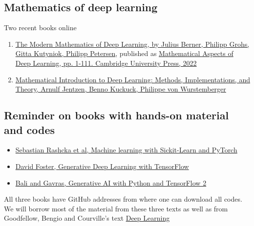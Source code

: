 \documentclass[%
oneside,                 %
final,                   %
10pt]{article}
\begin{document}
\subsection{Mathematics of deep learning}

\begin{block}{Two recent books online }
\begin{enumerate}
\item \href{{https://arxiv.org/abs/2105.04026}}{The Modern Mathematics of Deep Learning, by Julius Berner, Philipp Grohs, Gitta Kutyniok, Philipp Petersen}, published as \href{{https://doi.org/10.1017/9781009025096.002}}{Mathematical Aspects of Deep Learning, pp. 1-111. Cambridge University Press, 2022}

\item \href{{https://doi.org/10.48550/arXiv.2310.20360}}{Mathematical Introduction to Deep Learning: Methods, Implementations, and Theory, Arnulf Jentzen, Benno Kuckuck, Philippe von Wurstemberger}
\end{enumerate}

\noindent
\end{block}

\subsection{Reminder on books with hands-on material and codes}
\begin{block}{}
\begin{itemize}
\item \href{{https://sebastianraschka.com/blog/2022/ml-pytorch-book.html}}{Sebastian Rashcka et al, Machine learning with Sickit-Learn and PyTorch}

\item \href{{https://www.oreilly.com/library/view/generative-deep-learning/9781098134174/ch01.html}}{David Foster, Generative Deep Learning with TensorFlow}

\item \href{{https://github.com/PacktPublishing/Hands-On-Generative-AI-with-Python-and-TensorFlow-2}}{Bali and Gavras, Generative AI with Python and TensorFlow 2}
\end{itemize}

\noindent
\end{block}

All three books have GitHub addresses from where  one can download all codes. We will borrow most of the material from these three texts as well as 
from Goodfellow, Bengio and Courville's text \href{{https://www.deeplearningbook.org/}}{Deep Learning}
\end{document}
